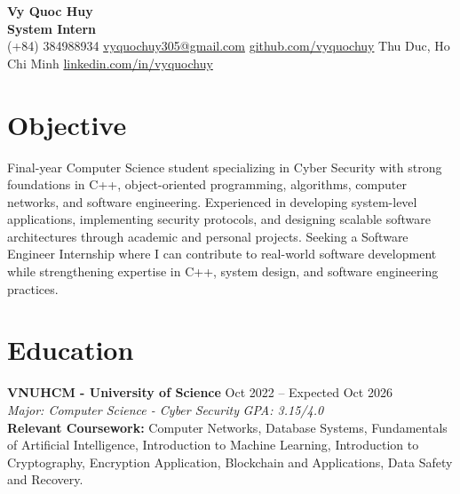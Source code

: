 \documentclass[10pt,a4paper]{article}
\begin{document}
\pagestyle{empty}

\begin{center}
    {\huge \textbf{Vy Quoc Huy}} \\ \vspace{4pt}
    {\Large \textbf{System Intern}} \\ \vspace{4pt}
    (+84) 384988934 \quad \href{mailto:vyquochuy305@gmail.com}{vyquochuy305@gmail.com} \quad \href{https://github.com/vyquochuy}{github.com/vyquochuy} \quad Thu Duc, Ho Chi Minh \quad \href{https://www.linkedin.com/in/vyquochuy/}{linkedin.com/in/vyquochuy}
\end{center}

\section*{Objective}
Final-year Computer Science student specializing in Cyber Security with strong foundations in C++, object-oriented programming, algorithms, computer networks, and software engineering. Experienced in developing system-level applications, implementing security protocols, and designing scalable software architectures through academic and personal projects. Seeking a Software Engineer Internship where I can contribute to real-world software development while strengthening expertise in C++, system design, and software engineering practices.

\section*{Education}
\noindent \textbf{VNUHCM - University of Science} \hfill Oct 2022 -- Expected Oct 2026\\
\textit{Major: Computer Science - Cyber Security} \hfill \textit{GPA: 3.15/4.0}\\
\textbf{Relevant Coursework:} Computer Networks, Database Systems, Fundamentals of Artificial Intelligence, Introduction to Machine Learning, Introduction to Cryptography, Encryption Application, Blockchain and Applications, Data Safety and Recovery.

\end{document}
